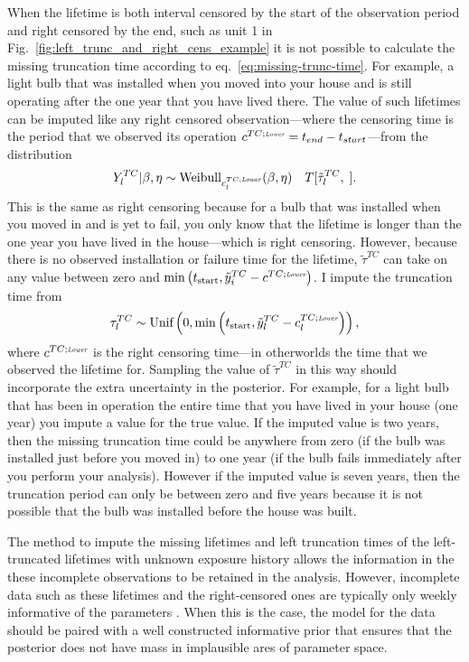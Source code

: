 When the lifetime is both interval censored by the start of the observation period and right censored by the end, such as unit 1 in Fig.~\ref{fig:left_trunc_and_right_cens_example} it is not possible to calculate the missing truncation time according to eq.~\eqref{eq:missing-trunc-time}. For example, a light bulb that was installed when you moved into your house and is still operating after the one year that you have lived there. The value of such lifetimes can be imputed like any right censored observation---where the censoring time is the period that we observed its operation $c^{TC;\textit{\tiny{Lower}}} = t_{end} - t_{start}$---from the distribution
\begin{equation}
    Y^{TC}_l|\beta, \eta \sim \hbox{Weibull}_{c^{TC;\textit{\tiny{Lower}}}_{l}}(\beta, \eta) \quad T[\tilde{\tau}^{TC}_l, \;]. 
\end{equation}
This is the same as right censoring because for a bulb that was installed when you moved in and is yet to fail, you only know that the lifetime is longer than the one year you have lived in the house---which is right censoring. However, because there is no observed installation or failure time for the lifetime, $\tilde{\tau}^{TC}$ can take on any value between zero and $\min\left(t_\text{start}, \tilde{y}^{TC}_i - c^{TC;\textit{\tiny{Lower}}}\right)$. I impute the truncation time from
\begin{equation}
    \label{eq:imp-trun-times}
    \tau^{TC}_l \sim \hbox{Unif}\left(0, \min\left(t_\text{start}, \tilde{y}^{TC}_l - c^{TC;\textit{\tiny{Lower}}}_l\right)\right),
\end{equation}
where $c^{TC;\textit{\tiny{Lower}}}$ is the right censoring time---in otherworlds the time that we observed the lifetime for. Sampling the value of $\tilde{\tau}^{TC}$ in this way should incorporate the extra uncertainty in the posterior. For example, for a light bulb that has been in operation the entire time that you have lived in your house (one year) you impute a value for the true value. If the imputed value is two years, then the missing truncation time could be anywhere from zero (if the bulb was installed just before you moved in) to one year (if the bulb fails immediately after you perform your analysis). However if the imputed value is seven years, then the truncation period can only be between zero and five years because it is not possible that the bulb was installed before the house was built.

The method to impute the missing lifetimes and left truncation times of the left-truncated lifetimes with unknown exposure history allows the information in the these incomplete observations to be retained in the analysis. However, incomplete data such as these lifetimes and the right-censored ones are typically only weekly informative of the parameters \citep{tian2024}. When this is the case, the model for the data should be paired with a well constructed informative prior that ensures that the posterior does not have mass in implausible ares of parameter space. 

